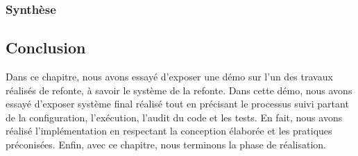 \subsubsection{Synthèse}
\subsection*{Conclusion}
Dans ce chapitre, nous avons essayé d'exposer une démo sur l'un des travaux réalisés de refonte, à savoir le système de la refonte. Dans cette démo, nous avons essayé d'exposer  système final réalisé tout en précisant le processus suivi partant de la configuration, l'exécution, l'audit du code et les tests.
En fait, nous avons réalisé l'implémentation en respectant la conception élaborée et les pratiques préconisées.
Enfin, avec ce chapitre, nous terminons la phase de réalisation.
